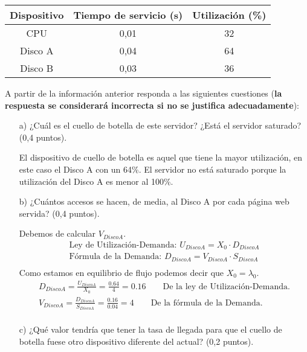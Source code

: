 \documentclass[a4paper,12pt]{article}
\begin{document}
\begin{center}
\begin{tabular}{|c|c|c|}
\hline
Dispositivo & Tiempo de servicio (s) & Utilización (\%) \\
\hline
CPU & 0,01 & 32 \\
Disco A & 0,04 & 64 \\
Disco B & 0,03 & 36 \\
\hline
\end{tabular}
\end{center}

A partir de la información anterior responda a las siguientes cuestiones (\textbf{la respuesta se considerará incorrecta si no se justifica adecuadamente}):
\begin{enumerate}
    \item[a)] ¿Cuál es el cuello de botella de este servidor? ¿Está el servidor saturado? (0,4 puntos).
    
    El dispositivo de cuello de botella es aquel que tiene la mayor utilización, en este caso el Disco A con un 64\%. El servidor no está saturado porque la utilización del Disco A es menor al 100\%. 

    \item[b)] ¿Cuántos accesos se hacen, de media, al Disco A por cada página web servida? (0,4 puntos).
    
    Debemos de calcular $V_{DiscoA}$.
    \begin{align*}
        \text{Ley de Utilización-Demanda: } U_{DiscoA} = X_0 \cdot D_{DiscoA}\\
        \text{Fórmula de la Demanda: } D_{DiscoA} = V_{DiscoA} \cdot S_{DiscoA}\\  
    \end{align*}
    Como estamos en equilibrio de flujo podemos decir que $X_0 = \lambda_0$.
    \begin{align*}
        D_{DiscoA} = \frac{U_{DiscoA}}{X_0} = \frac{0.64}{4} = 0.16 \qquad \text{De la ley de Utilización-Demanda.}\\
        V_{DiscoA} = \frac{D_{DiscoA}}{S_{DiscoA}} = \frac{0.16}{0.04} = \boxed{4} \qquad \text{De la fórmula de la Demanda.}\\
    \end{align*}

    \item[c)] ¿Qué valor tendría que tener la tasa de llegada para que el cuello de botella fuese otro dispositivo diferente del actual? (0,2 puntos).
    

\end{enumerate}
\end{document}
